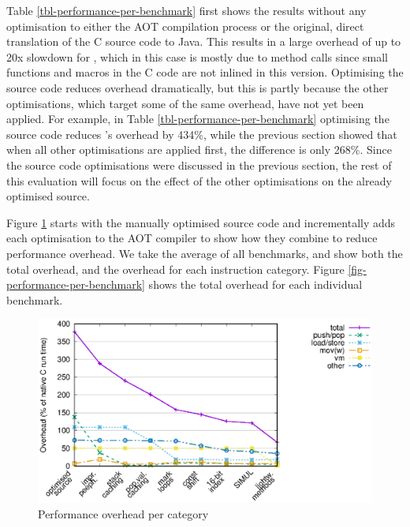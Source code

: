 Table \ref{tbl-performance-per-benchmark} first shows the results without any optimisation to either the AOT compilation process or the original, direct translation of the C source code to Java. This results in a large overhead of up to 20x slowdown for , which in this case is mostly due to method calls since small functions and macros in the C code are not inlined in this version. Optimising the source code reduces overhead dramatically, but this is partly because the other optimisations, which target some of the same overhead, have not yet been applied. For example, in Table \ref{tbl-performance-per-benchmark} optimising the source code reduces 's overhead by 434\%, while the previous section showed that when all other optimisations are applied first, the difference is only 268\%. Since the source code optimisations were discussed in the previous section, the rest of this evaluation will focus on the effect of the other optimisations on the already optimised source.

Figure \ref{fig-performance-per-opcode-category} starts with the manually optimised source code and incrementally adds each optimisation to the AOT compiler to show how they combine to reduce performance overhead. We take the average of all benchmarks, and show both the total overhead, and the overhead for each instruction category. Figure \ref{fig-performance-per-benchmark} shows the total overhead for each individual benchmark.

\begin{figure}
\centering
\includegraphics[width=\mygraphsize]{performance-per-opcode-category3a.eps}
\caption{Performance overhead per category}
\label{fig-performance-per-opcode-category}
\end{figure}

